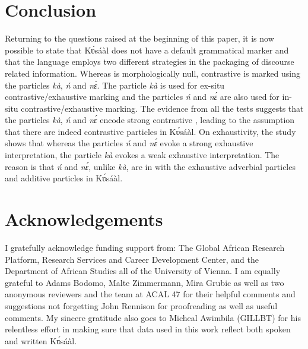 \documentclass[output=paper
,newtxmath
,modfonts
,nonflat]{langsci/langscibook}
\begin{document}
\section{Conclusion}

Returning to the questions raised at the beginning of this paper, it is now possible to state that Kʋ́sáàl does not have a default grammatical  marker and that the language employs two different strategies in the packaging of discourse related information. Whereas  is morphologically null, contrastive  is marked using the particles \textit{kà}, \textit{ń} and \textit{nɛ́}. The particle \textit{kà} is used for ex-situ contrastive/exhaustive  marking and the particles \textit{ń} and \textit{nɛ́} are also used for in-situ contrastive/exhaustive  marking. The evidence from all the tests suggests that the particles \textit{kà}, \textit{ń} and \textit{nɛ́} encode strong contrastive , leading to the assumption that there are indeed contrastive  particles in Kʋ́sáàl. On exhaustivity, the study shows that whereas the particles \textit{ń} and \textit{nɛ́} evoke a strong exhaustive  interpretation, the particle \textit{kà} evokes a weak exhaustive  interpretation.  The reason is that \textit{ń} and \textit{nɛ́}, unlike \textit{kà}, are in  with the exhaustive adverbial particles and additive particles in Kʋ́sáàl. 

\section*{Acknowledgements}
I gratefully acknowledge funding support from: The Global African Research Platform, Research Services and Career Development Center, and the Department of African Studies all of the University of Vienna. I am equally grateful to Adams Bodomo, Malte Zimmermann, Mira Grubic as well as two anonymous reviewers and the team at ACAL 47 for their helpful comments and suggestions not forgetting John Rennison for proofreading as well as useful comments. My sincere gratitude also goes to Micheal Awimbila (GILLBT) for his relentless effort in making sure that data used in this work reflect both spoken and written Kʋ́sáàl.                                      
\end{document}
